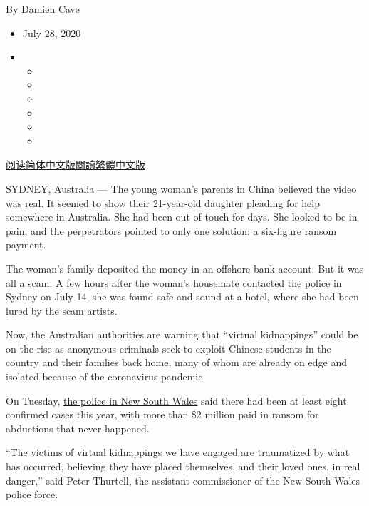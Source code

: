 By \href{https://www.nytimes3xbfgragh.onion/by/damien-cave}{Damien Cave}

\begin{itemize}
\item
  July 28, 2020
\item
  \begin{itemize}
  \item
  \item
  \item
  \item
  \item
  \item
  \end{itemize}
\end{itemize}

\href{https://cn.nytimes3xbfgragh.onion/asia-pacific/20200729/chinese-students-virtual-kidnapping/}{阅读简体中文版}\href{https://cn.nytimes3xbfgragh.onion/asia-pacific/20200729/chinese-students-virtual-kidnapping/zh-hant/}{閱讀繁體中文版}

SYDNEY, Australia --- The young woman's parents in China believed the
video was real. It seemed to show their 21-year-old daughter pleading
for help somewhere in Australia. She had been out of touch for days. She
looked to be in pain, and the perpetrators pointed to only one solution:
a six-figure ransom payment.

The woman's family deposited the money in an offshore bank account. But
it was all a scam. A few hours after the woman's housemate contacted the
police in Sydney on July 14, she was found safe and sound at a hotel,
where she had been lured by the scam artists.

Now, the Australian authorities are warning that ``virtual kidnappings''
could be on the rise as anonymous criminals seek to exploit Chinese
students in the country and their families back home, many of whom are
already on edge and isolated because of the coronavirus pandemic.

On Tuesday,
\href{https://www.facebookcorewwwi.onion/nswpoliceforce/posts/10158124537291185}{the
police in New South Wales} said there had been at least eight confirmed
cases this year, with more than \$2 million paid in ransom for
abductions that never happened.

``The victims of virtual kidnappings we have engaged are traumatized by
what has occurred, believing they have placed themselves, and their
loved ones, in real danger,'' said Peter Thurtell, the assistant
commissioner of the New South Wales police force.

